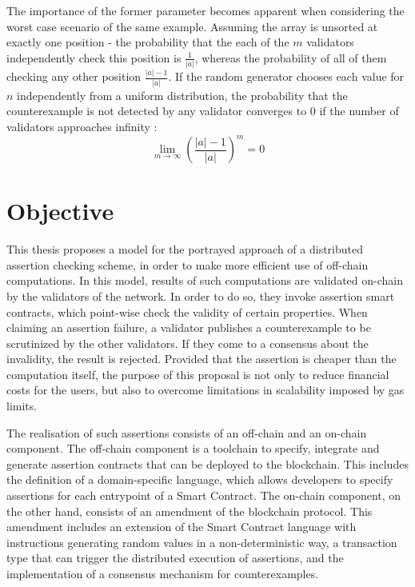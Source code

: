 The importance of the former parameter becomes apparent when considering the worst case scenario of the same example. Assuming the array is unsorted at exactly one position - the probability that the each of the $m$ validators independently check this position is $\frac{1}{|a|}$, whereas the probability of all of them checking any other position $\frac{|a|-1}{|a|}$. If the random generator chooses each value for $n$ independently from a uniform distribution, the probability that the counterexample is not detected by any validator converges to 0 if the number of validators approaches infinity \cite{thiemann_2020}:
\begin{equation}\label{eq:limes_validators}
	\lim_{m\to\infty} \left(\frac{|a|-1}{|a|}\right)^m = 0
\end{equation}

\section{Objective}
This thesis proposes a model for the portrayed approach of a distributed assertion checking scheme, in order to make more efficient use of off-chain computations. In this model, results of such computations are validated on-chain by the validators of the network. In order to do so, they invoke assertion smart contracts, which point-wise check the validity of certain properties. When claiming an assertion failure, a validator publishes a counterexample to be scrutinized by the other validators. If they come to a consensus about the invalidity, the result is rejected. Provided that the assertion is cheaper than the computation itself, the purpose of this proposal is not only to reduce financial costs for the users, but also to overcome limitations in scalability imposed by gas limits.

The realisation of such assertions consists of an off-chain and an on-chain component. The off-chain component is a toolchain to specify, integrate and generate assertion contracts that can be deployed to the blockchain. This includes the definition of a domain-specific language, which allows developers to specify assertions for each entrypoint of a Smart Contract. The on-chain component, on the other hand, consists of an amendment of the blockchain protocol. This amendment includes an extension of the Smart Contract language with instructions generating random values in a non-deterministic way, a transaction type that can trigger the distributed execution of assertions, and the implementation of a consensus mechanism for counterexamples. 

